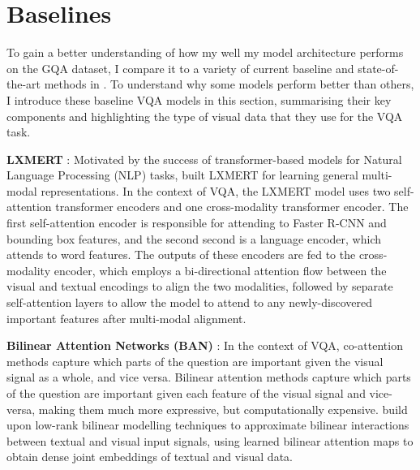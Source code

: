 \section{Baselines}

To gain a better understanding of how my well my model architecture performs on the GQA dataset, I compare it to a variety of current baseline and state-of-the-art methods in \chapterautorefname{ \ref{chapter:results}}. To understand why some models perform better than others, I introduce these baseline VQA models in this section, summarising their key components and highlighting the type of visual data that they use for the VQA task.

\textbf{LXMERT} \cite{tan2019lxmert}: Motivated by the success of transformer-based models \cite{vaswani2017attention} for Natural Language Processing (NLP) tasks, \citeauthor{tan2019lxmert} built LXMERT for learning general multi-modal representations. In the context of VQA, the LXMERT model uses two self-attention transformer encoders and one cross-modality transformer encoder. The first self-attention encoder is responsible for attending to Faster R-CNN \cite{ren2016faster} and bounding box features, and the second second is a language encoder, which attends to word features. The outputs of these encoders are fed to the cross-modality encoder, which employs a bi-directional attention flow between the visual and textual encodings to align the two modalities, followed by separate self-attention layers to allow the model to attend to any newly-discovered important features after multi-modal alignment.

\textbf{Bilinear Attention Networks (BAN)} \cite{kim2018bilinear}: In the context of VQA, co-attention methods capture which parts of the question are important given the visual signal as a whole, and vice versa. Bilinear attention methods capture which parts of the question are important given each feature of the visual signal and vice-versa, making them much more expressive, but computationally expensive. \citeauthor{kim2018bilinear} build upon low-rank bilinear modelling techniques \cite{wolf2007modeling, pirsiavash2009bilinear} to approximate bilinear interactions between textual and visual input signals, using learned bilinear attention maps to obtain dense joint embeddings of textual and visual data.


